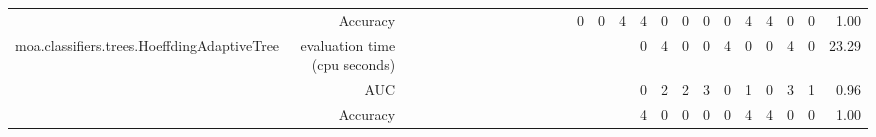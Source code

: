 \documentclass{article}
\providecommand{\tabularnewline}{\\}
\begin{document}
\begin{sidewaystable}
\begin{tabular}{|r|r|rrrrrrrr|r|r|r|r|r|r|r|r|r|r|r|r|r|r|r|r|r|}
 \cline{2-2} \cline{15-27}
 & Accuracy & \multicolumn{1}{r}{} & \multicolumn{1}{r}{} & \multicolumn{1}{r}{} & \multicolumn{1}{r}{} & \multicolumn{1}{r}{} & \multicolumn{1}{r}{} & \multicolumn{1}{r}{} & \multicolumn{1}{r}{} & \multicolumn{1}{r}{} & \multicolumn{1}{r}{} & \multicolumn{1}{r}{} & \multicolumn{1}{r|}{} & \multicolumn{1}{r|}{0} & \multicolumn{1}{r|}{0} & \multicolumn{1}{r|}{4} & \multicolumn{1}{r|}{4} & \multicolumn{1}{r|}{0} & \multicolumn{1}{r|}{0} & \multicolumn{1}{r|}{0} & \multicolumn{1}{r|}{0} & \multicolumn{1}{r|}{4} & \multicolumn{1}{r|}{4} & \multicolumn{1}{r|}{0} & \multicolumn{1}{r|}{0} & 1.00\tabularnewline
 \cline{1-2} \cline{15-27}
\multirow{3}{*}{moa.classifiers.trees.HoeffdingAdaptiveTree} & evaluation time (cpu seconds) & \multicolumn{1}{r}{} & \multicolumn{1}{r}{} & \multicolumn{1}{r}{} & \multicolumn{1}{r}{} & \multicolumn{1}{r}{} & \multicolumn{1}{r}{} & \multicolumn{1}{r}{} & \multicolumn{1}{r}{} & \multicolumn{1}{r}{} & \multicolumn{1}{r}{} & \multicolumn{1}{r}{} & \multicolumn{1}{r}{} & \multicolumn{1}{r}{} & \multicolumn{1}{r}{} & \multicolumn{1}{r|}{} & \multicolumn{1}{r|}{0} & \multicolumn{1}{r|}{4} & \multicolumn{1}{r|}{0} & \multicolumn{1}{r|}{0} & \multicolumn{1}{r|}{4} & \multicolumn{1}{r|}{0} & \multicolumn{1}{r|}{0} & \multicolumn{1}{r|}{4} & \multicolumn{1}{r|}{0} & 23.29\tabularnewline
 \cline{2-2} \cline{18-27}
 & AUC & \multicolumn{1}{r}{} & \multicolumn{1}{r}{} & \multicolumn{1}{r}{} & \multicolumn{1}{r}{} & \multicolumn{1}{r}{} & \multicolumn{1}{r}{} & \multicolumn{1}{r}{} & \multicolumn{1}{r}{} & \multicolumn{1}{r}{} & \multicolumn{1}{r}{} & \multicolumn{1}{r}{} & \multicolumn{1}{r}{} & \multicolumn{1}{r}{} & \multicolumn{1}{r}{} & \multicolumn{1}{r|}{} & \multicolumn{1}{r|}{0} & \multicolumn{1}{r|}{2} & \multicolumn{1}{r|}{2} & \multicolumn{1}{r|}{3} & \multicolumn{1}{r|}{0} & \multicolumn{1}{r|}{1} & \multicolumn{1}{r|}{0} & \multicolumn{1}{r|}{3} & \multicolumn{1}{r|}{1} & 0.96\tabularnewline
 \cline{2-2} \cline{18-27}
 & Accuracy & \multicolumn{1}{r}{} & \multicolumn{1}{r}{} & \multicolumn{1}{r}{} & \multicolumn{1}{r}{} & \multicolumn{1}{r}{} & \multicolumn{1}{r}{} & \multicolumn{1}{r}{} & \multicolumn{1}{r}{} & \multicolumn{1}{r}{} & \multicolumn{1}{r}{} & \multicolumn{1}{r}{} & \multicolumn{1}{r}{} & \multicolumn{1}{r}{} & \multicolumn{1}{r}{} & \multicolumn{1}{r|}{} & \multicolumn{1}{r|}{4} & \multicolumn{1}{r|}{0} & \multicolumn{1}{r|}{0} & \multicolumn{1}{r|}{0} & \multicolumn{1}{r|}{0} & \multicolumn{1}{r|}{4} & \multicolumn{1}{r|}{4} & \multicolumn{1}{r|}{0} & \multicolumn{1}{r|}{0} & 1.00\tabularnewline

\end{tabular}
\end{sidewaystable}
\end{document}

